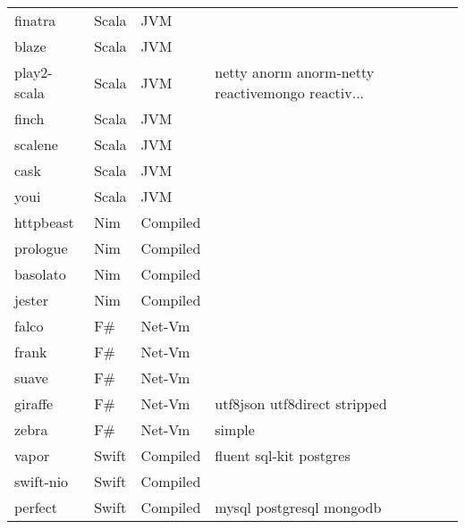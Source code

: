 \begin{longtable}{llll}
    finatra          & Scala & JVM       &                                                    \\
    blaze            & Scala & JVM       &                                                    \\
    play2-scala      & Scala & JVM       & netty anorm anorm-netty reactivemongo reactiv...   \\
    finch            & Scala & JVM       &                                                    \\
    scalene          & Scala & JVM       &                                                    \\
    cask             & Scala & JVM       &                                                    \\
    youi             & Scala & JVM       &                                                    \\
    httpbeast        & Nim & Compiled         &                                                    \\
    prologue         & Nim & Compiled         &                                                    \\
    basolato         & Nim & Compiled         &                                                    \\
    jester           & Nim & Compiled         &                                                    \\
    falco            & F\# & Net-Vm         &                                                    \\
    frank            & F\# & Net-Vm         &                                                    \\
    suave            & F\# & Net-Vm         &                                                    \\
    giraffe          & F\# & Net-Vm         & utf8json utf8direct stripped                       \\
    zebra            & F\# & Net-Vm         & simple                                             \\
    vapor            & Swift & Compiled       & fluent sql-kit postgres                            \\
    swift-nio        & Swift & Compiled       &                                                    \\
    perfect          & Swift & Compiled       & mysql postgresql mongodb                           \\

\end{longtable}
